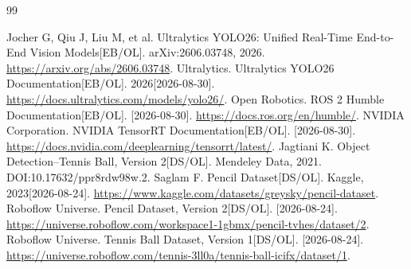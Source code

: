 \documentclass[UTF8,zihao=-4,scheme=chinese,fontset=none]{ctexart}
\begin{document}
\clearpage\begingroup\sloppy\begin{thebibliography}{99}
 Jocher G, Qiu J, Liu M, et al. Ultralytics YOLO26: Unified Real-Time End-to-End Vision Models[EB/OL]. arXiv:2606.03748, 2026. \url{https://arxiv.org/abs/2606.03748}.
 Ultralytics. Ultralytics YOLO26 Documentation[EB/OL]. 2026[2026-08-30]. \url{https://docs.ultralytics.com/models/yolo26/}.
 Open Robotics. ROS 2 Humble Documentation[EB/OL]. [2026-08-30]. \url{https://docs.ros.org/en/humble/}.
 NVIDIA Corporation. NVIDIA TensorRT Documentation[EB/OL]. [2026-08-30]. \url{https://docs.nvidia.com/deeplearning/tensorrt/latest/}.
 Jagtiani K. Object Detection--Tennis Ball, Version 2[DS/OL]. Mendeley Data, 2021. DOI:10.17632/ppr8rdw98w.2.
 Saglam F. Pencil Dataset[DS/OL]. Kaggle, 2023[2026-08-24]. \url{https://www.kaggle.com/datasets/greysky/pencil-dataset}.
 Roboflow Universe. Pencil Dataset, Version 2[DS/OL]. [2026-08-24]. \url{https://universe.roboflow.com/workspace1-1gbmx/pencil-tvhes/dataset/2}.
 Roboflow Universe. Tennis Ball Dataset, Version 1[DS/OL]. [2026-08-24]. \url{https://universe.roboflow.com/tennis-3ll0a/tennis-ball-icifx/dataset/1}.
\end{thebibliography}\endgroup
\end{document}
